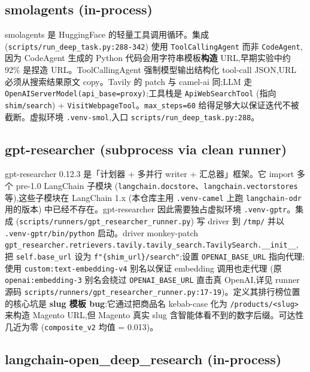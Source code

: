 \documentclass[UTF8,a4paper,12pt,oneside]{ctexart}
\begin{document}
\subsection{smolagents (in-process)}

smolagents 是 HuggingFace 的轻量工具调用循环。集成 (\texttt{scripts/run\_deep\_task.py:288-342}) 使用 \texttt{ToolCallingAgent} 而非 \texttt{CodeAgent},因为 CodeAgent 生成的 Python 代码会用字符串模板\textbf{构造} URL,早期实验中约 92\% 是捏造 URL。ToolCallingAgent 强制模型输出结构化 tool-call JSON,URL 必须从搜索结果原文 copy。Tavily 的 patch 与 camel-ai 同;LLM 走 \texttt{OpenAIServerModel(api\_base=proxy)};工具栈是 \texttt{ApiWebSearchTool} (指向 \texttt{shim/search}) + \texttt{VisitWebpageTool}。\texttt{max\_steps=60} 给得足够大以保证迭代不被截断。虚拟环境 \texttt{.venv-smol},入口 \texttt{scripts/run\_deep\_task.py:288}。

\subsection{gpt-researcher (subprocess via clean runner)}

gpt-researcher 0.12.3 是「计划器 + 多并行 writer + 汇总器」框架。它 import 多个 pre-1.0 LangChain 子模块 (\texttt{langchain.docstore}、\texttt{langchain.vectorstores} 等),这些子模块在 LangChain 1.x (本仓库主用 \texttt{.venv-camel} 上跑 \texttt{langchain-odr} 用的版本) 中已经不存在。gpt-researcher 因此需要独占虚拟环境 \texttt{.venv-gptr}。集成 (\texttt{scripts/runners/gpt\_researcher\_runner.py}) 写 driver 到 \texttt{/tmp/} 并以 \texttt{.venv-gptr/bin/python} 启动。driver monkey-patch \texttt{gpt\_researcher.retrievers.tavily.tavily\_search.TavilySearch.\_\_init\_\_},把 \texttt{self.base\_url} 设为 \texttt{f"\{shim\_url\}/search"};设置 \texttt{OPENAI\_BASE\_URL} 指向代理;使用 \texttt{custom:text-embedding-v4} 别名以保证 embedding 调用也走代理 (原 \texttt{openai:embedding-3} 别名会绕过 \texttt{OPENAI\_BASE\_URL} 直击真 OpenAI,详见 runner 源码 \texttt{scripts/runners/gpt\_researcher\_runner.py:17-19})。定义其排行榜位置的核心坑是\textbf{ slug 模板 bug}:它通过把商品名 kebab-case 化为 \texttt{/products/<slug>} 来构造 Magento URL,但 Magento 真实 slug 含智能体看不到的数字后缀。可达性几近为零 (\texttt{composite\_v2} 均值 = 0.013)。

\subsection{langchain-open\_deep\_research (in-process)}
\end{document}
